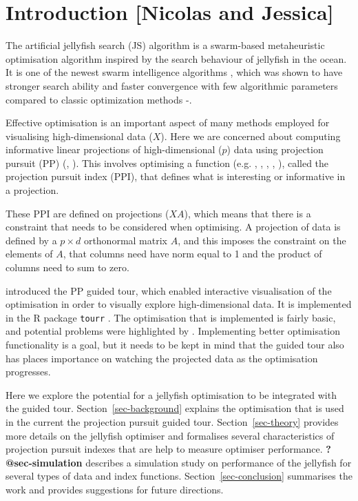 \documentclass[
  number,
  preprint,
  3p]{elsarticle}
\begin{document}
\section{Introduction {[}Nicolas and
Jessica{]}}\label{introduction-nicolas-and-jessica}

The artificial jellyfish search (JS) algorithm \citep{chou_novel_2021}
is a swarm-based metaheuristic optimisation algorithm inspired by the
search behaviour of jellyfish in the ocean. It is one of the newest
swarm intelligence algorithms \citep{rajwar_exhaustive_2023}, which was
shown to have stronger search ability and faster convergence with few
algorithmic parameters compared to classic optimization methods
\citep{chou_novel_2021}-\citep{chou_recent_2022}.

Effective optimisation is an important aspect of many methods employed
for visualising high-dimensional data (\(X\)). Here we are concerned
about computing informative linear projections of high-dimensional
(\(p\)) data using projection pursuit (PP) (\citet{kr69}, \citet{FT74}).
This involves optimising a function (e.g. \citet{hall1989polynomial},
\citet{cook1993projection}, \citet{lee2010projection},
\citet{Loperfido2018}, \citet{Loperfido2020}), called the projection
pursuit index (PPI), that defines what is interesting or informative in
a projection.

These PPI are defined on projections (\(XA\)), which means that there is
a constraint that needs to be considered when optimising. A projection
of data is defined by a \(p\times d\) orthonormal matrix \(A\), and this
imposes the constraint on the elements of \(A\), that columns need have
norm equal to 1 and the product of columns need to sum to zero.

\citet{cook1995grand} introduced the PP guided tour, which enabled
interactive visualisation of the optimisation in order to visually
explore high-dimensional data. It is implemented in the R \citep{R}
package \texttt{tourr} \citep{tourr}. The optimisation that is
implemented is fairly basic, and potential problems were highlighted by
\citet{RJ-2021-105}. Implementing better optimisation functionality is a
goal, but it needs to be kept in mind that the guided tour also has
places importance on watching the projected data as the optimisation
progresses.

Here we explore the potential for a jellyfish optimisation to be
integrated with the guided tour. Section~\ref{sec-background} explains
the optimisation that is used in the current the projection pursuit
guided tour. Section~\ref{sec-theory} provides more details on the
jellyfish optimiser and formalises several characteristics of projection
pursuit indexes that are help to measure optimiser performance.
\textbf{?@sec-simulation} describes a simulation study on performance of
the jellyfish for several types of data and index functions.
Section~\ref{sec-conclusion} summarises the work and provides
suggestions for future directions.
\end{document}
